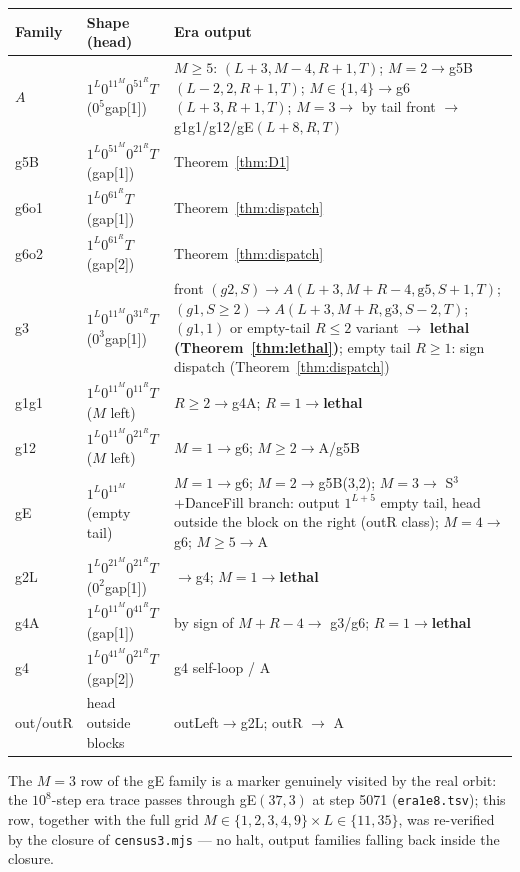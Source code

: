 \documentclass[11pt]{amsart}
\begin{document}
\begin{center}\small
\begin{tabular}{llp{8.8cm}}
\toprule
Family & Shape (head) & Era output\\
\midrule
$A$ & $1^L0^11^M0^51^RT$ ($0^5$gap[1]) & $M\ge5$: $(L{+}3,M{-}4,R{+}1,T)$; $M{=}2\to$g5B$(L{-}2,2,R{+}1,T)$; $M\in\{1,4\}\to$g6$(L{+}3,R{+}1,T)$; $M{=}3\to$ by tail front $\to$ g1g1/g12/gE$(L{+}8,R,T)$\\
g5B & $1^L0^51^M0^21^RT$ (gap[1]) & Theorem~\ref{thm:D1}\\
g6o1 & $1^L0^61^RT$ (gap[1]) & Theorem~\ref{thm:dispatch}\\
g6o2 & $1^L0^61^RT$ (gap[2]) & Theorem~\ref{thm:dispatch}\\
g3 & $1^L0^11^M0^31^RT$ ($0^3$gap[1]) & front $(g2,S)\to A(L{+}3,M{+}R{-}4,\mathrm{g5},S{+}1,T)$; $(g1,S{\ge}2)\to A(L{+}3,M{+}R,\mathrm{g3},S{-}2,T)$; $(g1,1)$ or empty-tail $R\le2$ variant $\to$ \textbf{lethal (Theorem~\ref{thm:lethal})}; empty tail $R\ge1$: sign dispatch (Theorem~\ref{thm:dispatch})\\
g1g1 & $1^L0^11^M0^11^RT$ ($M$ left) & $R\ge2\to$g4A; $R{=}1\to$\textbf{lethal}\\
g12 & $1^L0^11^M0^21^RT$ ($M$ left) & $M{=}1\to$g6; $M\ge2\to$A/g5B\\
gE & $1^L0^11^M$ (empty tail) & $M{=}1\to$g6; $M{=}2\to$g5B(3,2); $M{=}3\to$ S$^3$+DanceFill branch: output $1^{L+5}$ empty tail, head outside the block on the right (outR class); $M{=}4\to$g6; $M\ge5\to$A\\
g2L & $1^L0^21^M0^21^RT$ ($0^2$gap[1]) & $\to$g4; $M{=}1\to$\textbf{lethal}\\
g4A & $1^L0^11^M0^41^RT$ (gap[1]) & by sign of $M{+}R{-}4\to$ g3/g6; $R{=}1\to$\textbf{lethal}\\
g4 & $1^L0^41^M0^21^RT$ (gap[2]) & g4 self-loop / A\\
out/outR & head outside blocks & outLeft$\to$g2L; outR $\to$ A\\
\bottomrule
\end{tabular}
\end{center}

The $M{=}3$ row of the gE family is a marker genuinely visited by the real orbit: the $10^8$-step era trace passes through gE$(37,3)$ at step 5071 (\texttt{era1e8.tsv}); this row, together with the full grid $M\in\{1,2,3,4,9\}\times L\in\{11,35\}$, was re-verified by the closure of \texttt{census3.mjs} --- no halt, output families falling back inside the closure.
\end{document}
